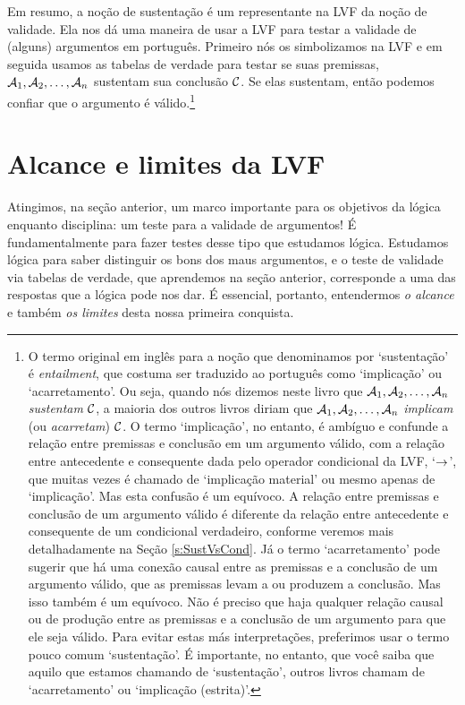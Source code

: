 Em resumo, a noção de sustentação é um representante na LVF da noção de validade.
Ela nos dá uma maneira de usar a LVF para testar a validade de (alguns) argumentos em português.
Primeiro nós os simbolizamos na LVF e em seguida usamos as tabelas de verdade para testar se suas premissas, $\mathcal{A}_1, \mathcal{A}_2, \ldots, \mathcal{A}_n$ sustentam sua conclusão $\mathcal{C}$.
Se elas sustentam, então podemos confiar que o argumento é válido.\footnote{
	O termo original em inglês para a noção que denominamos por `sustentação' é \emph{entailment}, que costuma ser traduzido ao português como `implicação' ou `acarretamento'.
	Ou seja, quando nós dizemos neste livro que $\mathcal{A}_1, \mathcal{A}_2, \ldots, \mathcal{A}_n$ \emph{sustentam} $\mathcal{C}$, a maioria dos outros livros diriam que $\mathcal{A}_1, \mathcal{A}_2, \ldots, \mathcal{A}_n$ \emph{implicam} (ou \emph{acarretam}) $\mathcal{C}$.
	O termo `implicação', no entanto, é ambíguo e confunde a relação entre premissas e conclusão em um argumento válido, com a relação entre antecedente e consequente dada pelo operador condicional da LVF, `$\rightarrow$', que muitas vezes é chamado de `implicação material' ou mesmo apenas de `implicação'.
	Mas esta confusão é um equívoco.
	A relação entre premissas e conclusão de um argumento válido é diferente da relação entre antecedente e consequente de um condicional verdadeiro, conforme veremos mais detalhadamente na Seção \ref{s:SustVsCond}.
	Já o termo `acarretamento' pode sugerir que há uma conexão causal entre as premissas e a conclusão de um argumento válido, que as premissas levam a ou produzem a conclusão.
	Mas isso também é um equívoco.
	Não é preciso que haja qualquer relação causal ou de produção entre as premissas e a conclusão de um argumento para que ele seja válido.
	Para evitar estas más interpretações, preferimos usar o termo pouco comum `sustentação'.
	É importante, no entanto, que você saiba que aquilo que estamos chamando de `sustentação', outros livros chamam de `acarretamento' ou `implicação (estrita)'.}


\section{Alcance e limites da LVF}\label{s:ParadoxesOfMaterialConditional}
Atingimos, na seção anterior, um marco importante para os objetivos da lógica enquanto disciplina: um teste para a validade de argumentos!
É fundamentalmente para fazer testes desse tipo que estudamos lógica.
Estudamos lógica para saber distinguir os bons dos maus argumentos, e o teste de validade via tabelas de verdade, que aprendemos na seção anterior, corresponde a uma das respostas que a lógica pode nos dar.
É essencial, portanto, entendermos \emph{o alcance} e também \emph{os limites} desta nossa primeira conquista.

